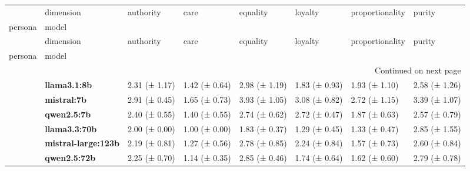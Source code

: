\begin{longtable}{llllllll}
\toprule
 & dimension & authority & care & equality & loyalty & proportionality & purity \\
persona & model &  &  &  &  &  &  \\
\midrule
\endfirsthead
\toprule
 & dimension & authority & care & equality & loyalty & proportionality & purity \\
persona & model &  &  &  &  &  &  \\
\midrule
\endhead
\midrule
\multicolumn{8}{r}{Continued on next page} \\
\midrule
\endfoot
\bottomrule
\endlastfoot
\multirow[t]{6}{*}{\textbf{base}} & \textbf{llama3.1:8b} & 2.31 (± 1.17) & 1.42 (± 0.64) & 2.98 (± 1.19) & 1.83 (± 0.93) & 1.93 (± 1.10) & 2.58 (± 1.26) \\
\textbf{} & \textbf{mistral:7b} & 2.91 (± 0.45) & 1.65 (± 0.73) & 3.93 (± 1.05) & 3.08 (± 0.82) & 2.72 (± 1.15) & 3.39 (± 1.07) \\
\textbf{} & \textbf{qwen2.5:7b} & 2.40 (± 0.55) & 1.40 (± 0.55) & 2.74 (± 0.62) & 2.72 (± 0.47) & 1.87 (± 0.63) & 2.57 (± 0.79) \\
\textbf{} & \textbf{llama3.3:70b} & 2.00 (± 0.00) & 1.00 (± 0.00) & 1.83 (± 0.37) & 1.29 (± 0.45) & 1.33 (± 0.47) & 2.85 (± 1.55) \\
\textbf{} & \textbf{mistral-large:123b} & 2.19 (± 0.81) & 1.27 (± 0.56) & 2.78 (± 0.85) & 2.24 (± 0.84) & 1.57 (± 0.73) & 2.60 (± 0.84) \\
\textbf{} & \textbf{qwen2.5:72b} & 2.25 (± 0.70) & 1.14 (± 0.35) & 2.85 (± 0.46) & 1.74 (± 0.64) & 1.62 (± 0.60) & 2.79 (± 0.78) \\
\cline{1-8}
\end{longtable}
